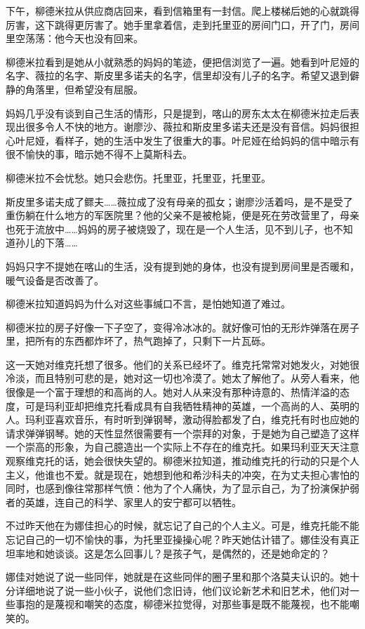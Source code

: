 下午，柳德米拉从供应商店回来，看到信箱里有一封信。爬上楼梯后她的心就跳得厉害，这下跳得更厉害了。她手里拿着信，走到托里亚的房间门口，开了门，房间里空荡荡：他今天也没有回来。

柳德米拉看到是她从小就熟悉的妈妈的笔迹，便把信浏览了一遍。她看到叶尼娅的名字、薇拉的名字、斯皮里多诺夫的名字，信里却没有儿子的名字。希望又退到僻静的角落里，但希望没有屈服。

妈妈几乎没有谈到自己生活的情形，只是提到，喀山的房东太太在柳德米拉走后表现出很多令人不快的地方。谢廖沙、薇拉和斯皮里多诺夫还是没有音信。妈妈很担心叶尼娅，看样子，她的生活中发生了很重大的事。叶尼娅在给妈妈的信中暗示有很不愉快的事，暗示她不得不上莫斯科去。

柳德米拉不会忧愁。她只会悲伤。托里亚，托里亚，托里亚。

斯皮里多诺夫成了鳏夫……薇拉成了没有母亲的孤女；谢廖沙活着吗，是不是受了重伤躺在什么地方的军医院里？他的父亲不是被枪毙，便是死在劳改营里了，母亲也死于流放中……妈妈的房子被烧毁了，现在是一个人生活，见不到儿子，也不知道孙儿的下落……

妈妈只字不提她在喀山的生活，没有提到她的身体，也没有提到房间里是否暖和，暖气设备是否改善了。

柳德米拉知道妈妈为什么对这些事缄口不言，是怕她知道了难过。

柳德米拉的房子好像一下子空了，变得冷冰冰的。就好像可怕的无形炸弹落在房子里，把所有的东西都炸坏了，热气跑掉了，只剩下一片瓦砾。

这一天她对维克托想了很多。他们的关系已经坏了。维克托常常对她发火，对她很冷淡，而且特别可悲的是，她对这一切也冷漠了。她太了解他了。从旁人看来，他很像是一个富于理想的和高尚的人。她对人从来没有那种诗意的、热情洋溢的态度，可是玛利亚却把维克托看成具有自我牺牲精神的英雄，一个高尚的人、英明的人。玛利亚喜欢音乐，有时听到弹钢琴，激动得脸都发了白，维克托有时也应她的请求弹弹钢琴。她的天性显然很需要有一个崇拜的对象，于是她为自己塑造了这样一个崇高的形象，为自己臆造出一个实际上不存在的维克托。如果玛利亚天天注意观察维克托的话，她会很快失望的。柳德米拉知道，推动维克托的行动的只是个人主义，他谁也不爱。就是现在，她想到他和希沙科夫的冲突，在为丈夫担心害怕的同时，也感到像往常那样气愤：他为了个人痛快，为了显示自己，为了扮演保护弱者的英雄，连自己的科学、家里人的安宁都可以牺牲。

不过昨天他在为娜佳担心的时候，就忘记了自己的个人主义。可是，维克托能不能忘记自己的一切不愉快的事，为托里亚操操心呢？昨天她估计错了。娜佳没有真正坦率地和她谈谈。这是怎么回事儿？是孩子气，是偶然的，还是她命定的？

娜佳对她说了说一些同伴，她就是在这些同伴的圈子里和那个洛莫夫认识的。她十分详细地说了说一些小伙子，说他们念旧诗，他们议论新艺术和旧艺术，他们对一些事抱的是蔑视和嘲笑的态度，柳德米拉觉得，对那些事是既不能蔑视，也不能嘲笑的。

